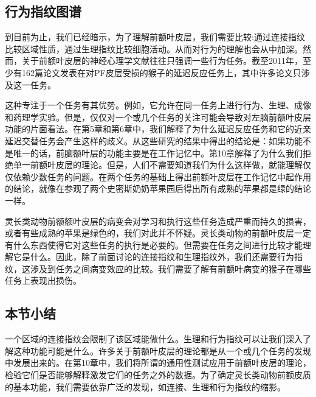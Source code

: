 \subsection{行为指纹图谱}
到目前为止，我们已经暗示，为了理解前额叶皮层，我们需要比较:通过连接指纹比较区域性质，通过生理指纹比较细胞活动。从而对行为的理解也会从中加深。然而，关于前额叶皮层的神经心理学文献往往只强调一些行为任务。截至2011年，至少有162篇论文发表在对PF皮层受损的猴子的延迟反应任务上，其中许多论文只涉及这一任务。

\par
这种专注于一个任务有其优势。例如，它允许在同一任务上进行行为、生理、成像和药理学实验。但是，仅仅对一个或几个任务的关注可能会导致对左脑前额叶皮层功能的片面看法。在第5章和第6章中，我们解释了为什么延迟反应任务和它的近亲延迟交替任务会产生这样的歧义。从这些研究的结果中得出的结论是：如果功能不是唯一的话，前脑额叶层的功能主要是在工作记忆中。第10章解释了为什么我们拒绝单一前额叶皮层的理论。但是，人们不需要知道我们为什么这样做，就能理解仅仅依赖少数任务的问题。在两个任务的基础上得出前额叶皮层在工作记忆中起作用的结论，就像在参观了两个史密斯奶奶苹果园后得出所有成熟的苹果都是绿的结论一样。
\par
灵长类动物前额额叶皮层的病变会对学习和执行这些任务造成严重而持久的损害，或者有些成熟的苹果是绿色的，我们对此并不怀疑。灵长类动物的前额叶皮层一定有什么东西使得它对这些任务的执行是必要的。但需要在任务之间进行比较才能理解它是什么。因此，除了前面讨论的连接指纹和生理指纹外，我们还需要行为指纹，这涉及到任务之间病变效应的比较。我们需要了解有前额叶病变的猴子在哪些任务上表现出损伤。

\subsection{本节小结}
一个区域的连接指纹会限制了该区域能做什么。生理和行为指纹可以让我们深入了解这种功能可能是什么。许多关于前额叶皮层的理论都是从一个或几个任务的发现中发展出来的。在第10章中，我们将所谓的通用性测试应用于前额叶皮层的理论，检验它们是否能够解释激发它们的任务之外的数据。为了确定灵长类动物前额皮质的基本功能，我们需要依靠广泛的发现，如连接、生理和行为指纹的缩影。

